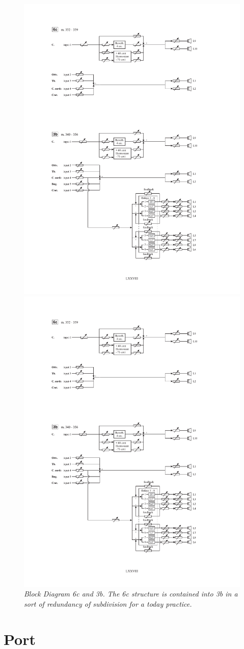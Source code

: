 \documentclass[twoside,a4paper]{article}
\begin{document}
\begin{figure}[ht]
\centerline{\includegraphics[width=.45\textwidth]{img/re-diagramma6c}}
\centerline{\includegraphics[width=.45\textwidth]{img/re-diagramma3b}}
\caption{\label{re-dia-6c}{\it Block Diagram 6c and 3b. The 6c structure is contained into 3b in a sort of redundancy of subdivision for a today practice.}}
\end{figure}


\section{Port}
\label{sec:porting}
\end{document}
